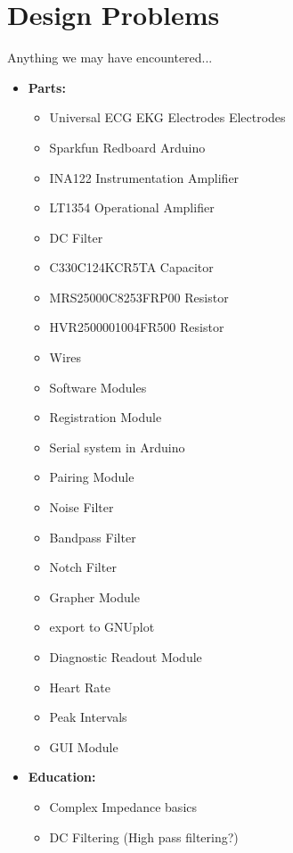 \documentclass[11pt, oneside]{article}   	%
\begin{document}
\section{Design Problems}
Anything we may have encountered...
	\begin{itemize}[leftmargin=*]
		\item[] \textbf{Parts:}
			\begin{itemize} 
				\item Universal ECG EKG Electrodes Electrodes
				\item Sparkfun Redboard Arduino
				\item INA122 Instrumentation Amplifier
				\item LT1354 Operational Amplifier
				\item DC Filter
					\item C330C124KCR5TA Capacitor
					\item MRS25000C8253FRP00 Resistor
					\item HVR2500001004FR500 Resistor
				\item Wires
				\item Software Modules
					\item Registration Module
						\item Serial system in Arduino
					\item Pairing Module
					\item Noise Filter
						\item Bandpass Filter
						\item Notch Filter
					\item Grapher Module
						\item export to GNUplot
					\item Diagnostic Readout Module
						\item Heart Rate
						\item Peak Intervals
					\item GUI Module
					
			\end{itemize}
		\item[] \textbf{Education:}
			\begin{itemize}
				\item Complex Impedance basics 
				\item DC Filtering (High pass filtering?)
			\end{itemize}
	\end{itemize}
\pagebreak
\end{document}
